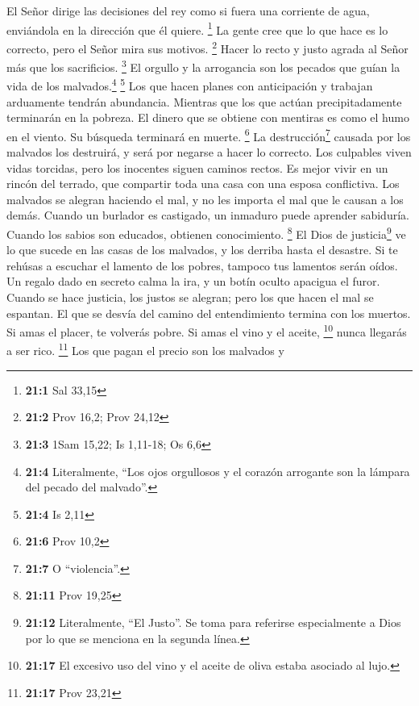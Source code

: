  El Señor dirige las decisiones del rey como si fuera una
corriente de agua, enviándola en la dirección que él quiere. \footnote{\textbf{21:1}
  Sal 33,15}  La gente cree que lo que hace es lo
correcto, pero el Señor mira sus motivos. \footnote{\textbf{21:2} Prov
  16,2; Prov 24,12}  Hacer lo recto y justo agrada al
Señor más que los sacrificios. \footnote{\textbf{21:3} 1Sam 15,22; Is
  1,11-18; Os 6,6}  El orgullo y la arrogancia son los
pecados que guían la vida de los malvados.\footnote{\textbf{21:4}
  Literalmente, ``Los ojos orgullosos y el corazón arrogante son la
  lámpara del pecado del malvado''.} \footnote{\textbf{21:4} Is 2,11}
 Los que hacen planes con anticipación y trabajan
arduamente tendrán abundancia. Mientras que los que actúan
precipitadamente terminarán en la pobreza.  El dinero que
se obtiene con mentiras es como el humo en el viento. Su búsqueda
terminará en muerte. \footnote{\textbf{21:6} Prov 10,2} 
La destrucción\footnote{\textbf{21:7} O ``violencia''.} causada por los
malvados los destruirá, y será por negarse a hacer lo correcto.
 Los culpables viven vidas torcidas, pero los inocentes
siguen caminos rectos.  Es mejor vivir en un rincón del
terrado, que compartir toda una casa con una esposa conflictiva.
 Los malvados se alegran haciendo el mal, y no les
importa el mal que le causan a los demás.  Cuando un
burlador es castigado, un inmaduro puede aprender sabiduría. Cuando los
sabios son educados, obtienen conocimiento. \footnote{\textbf{21:11}
  Prov 19,25}  El Dios de justicia\footnote{\textbf{21:12}
  Literalmente, ``El Justo''. Se toma para referirse especialmente a
  Dios por lo que se menciona en la segunda línea.} ve lo que sucede en
las casas de los malvados, y los derriba hasta el desastre.
 Si te rehúsas a escuchar el lamento de los pobres,
tampoco tus lamentos serán oídos.  Un regalo dado en
secreto calma la ira, y un botín oculto apacigua el furor.
 Cuando se hace justicia, los justos se alegran; pero los
que hacen el mal se espantan.  El que se desvía del
camino del entendimiento termina con los muertos.  Si
amas el placer, te volverás pobre. Si amas el vino y el aceite,
\footnote{\textbf{21:17} El excesivo uso del vino y el aceite de oliva
  estaba asociado al lujo.} nunca llegarás a ser rico. \footnote{\textbf{21:17}
  Prov 23,21}  Los que pagan el precio son los malvados y
